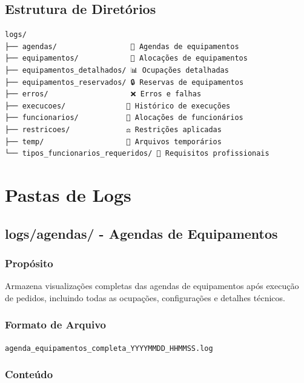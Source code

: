 \documentclass[11pt,a4paper]{article}
\begin{document}
\subsection{Estrutura de Diretórios}

\begin{tcolorbox}[colback=codebg,colframe=headerblue,title=Hierarquia de Pastas de Logs]
\begin{verbatim}
logs/
├── agendas/                 📅 Agendas de equipamentos
├── equipamentos/            🔧 Alocações de equipamentos
├── equipamentos_detalhados/ 📊 Ocupações detalhadas
├── equipamentos_reservados/ 🔒 Reservas de equipamentos
├── erros/                   ❌ Erros e falhas
├── execucoes/              🚀 Histórico de execuções
├── funcionarios/           👷 Alocações de funcionários
├── restricoes/             ⚖️ Restrições aplicadas
├── temp/                   📝 Arquivos temporários
└── tipos_funcionarios_requeridos/ 👥 Requisitos profissionais
\end{verbatim}
\end{tcolorbox}

\newpage

\section{Pastas de Logs}

\subsection{logs/agendas/ - Agendas de Equipamentos}

\subsubsection{Propósito}

Armazena visualizações completas das agendas de equipamentos após execução de pedidos, incluindo todas as ocupações, configurações e detalhes técnicos.

\subsubsection{Formato de Arquivo}

\texttt{agenda\_equipamentos\_completa\_YYYYMMDD\_HHMMSS.log}

\subsubsection{Conteúdo}
\end{document}
